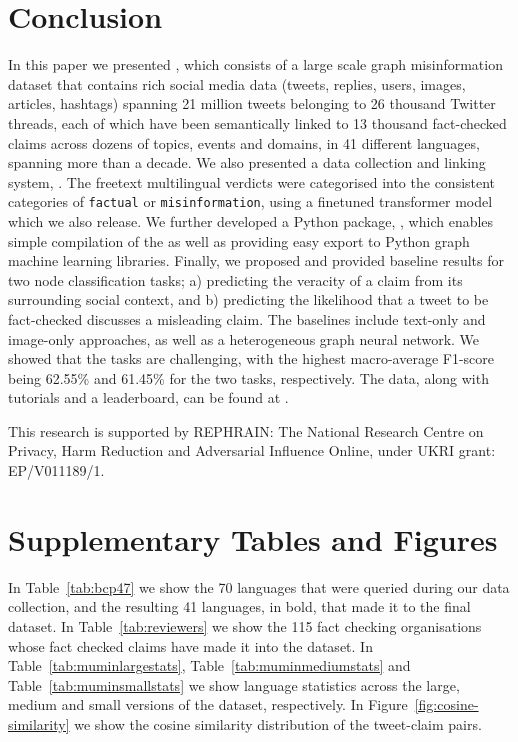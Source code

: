 \documentclass[sigconf,natbib=true,anonymous=false,nonacm]{acmart}
\newif\ifpreprint
\begin{document}
\section{Conclusion}
In this paper we presented  \datasetname , which consists of a large scale
graph misinformation dataset that contains rich social media data (tweets,
replies, users, images, articles, hashtags) spanning 21 million tweets
belonging to 26 thousand Twitter threads, each of which have been semantically
linked to 13 thousand fact-checked claims across dozens of topics, events and
domains, in 41 different languages, spanning more than a decade. We also
presented a data collection and linking system, \trawlname. The freetext
multilingual verdicts were categorised into the consistent categories of
\texttt{factual} or \texttt{misinformation}, using a finetuned transformer
model which we also release. We further developed a Python package, \pkgname,
which enables simple compilation of the \datasetname as well as providing easy
export to Python graph machine learning libraries. Finally, we proposed and
provided baseline results for two node classification tasks; a) predicting the
veracity of a claim from its surrounding social context, and b) predicting the
likelihood that a tweet to be fact-checked discusses a misleading claim. The
baselines include text-only and image-only approaches, as well as a
heterogeneous graph neural network. We showed that the tasks are challenging,
with the highest macro-average F1-score being 62.55\% and 61.45\% for the two
tasks, respectively. The data, along with tutorials and a leaderboard, can be
found at \dataseturl.


\begin{acks}
    This research is supported by REPHRAIN: The National Research Centre on
    Privacy, Harm Reduction and Adversarial Influence Online, under UKRI grant:
    EP/V011189/1.
\end{acks}



\clearpage

\ifpreprint

\appendix

\section{Supplementary Tables and Figures}

In Table~\ref{tab:bcp47} we show the 70 languages that were queried during our
data collection, and the resulting 41 languages, in bold, that made it to the
final dataset. In Table~\ref{tab:reviewers} we show the 115 fact checking
organisations whose fact checked claims have made it into the dataset. In
Table~\ref{tab:muminlargestats}, Table~\ref{tab:muminmediumstats} and
Table~\ref{tab:muminsmallstats} we show language statistics across the large,
medium and small versions of the dataset, respectively. In
Figure~\ref{fig:cosine-similarity} we show the cosine similarity distribution
of the tweet-claim pairs.
\end{document}
